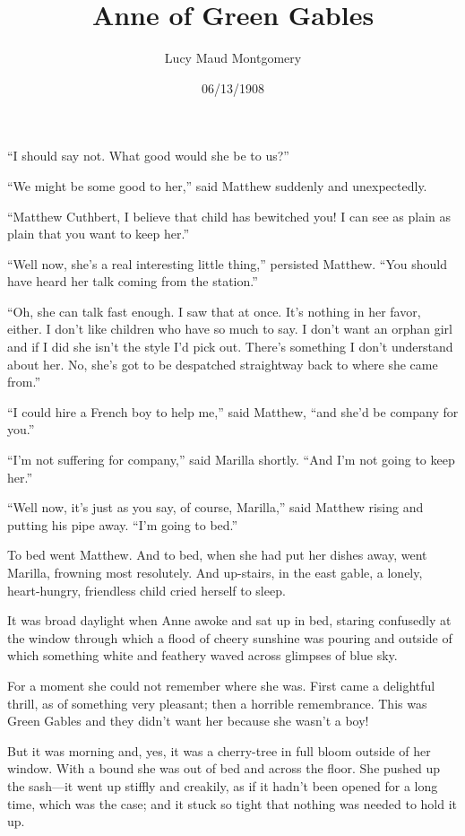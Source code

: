 \documentclass[a4paper]{article}
\title{Anne of Green Gables}
\author{Lucy Maud Montgomery}
\date{06/13/1908}
\begin{document}
\maketitle

{\sffamily ``I should say not. What good would she be to us?''

``We might be some good to her,'' said Matthew suddenly and unexpectedly.

``Matthew Cuthbert, I believe that child has bewitched you! I can see as plain as plain that you want to keep her.''

``Well now, she's a real interesting little thing,'' persisted Matthew. ``You should have heard her talk coming from the station.''

``Oh, she can talk fast enough. I saw that at once. It's nothing in her favor, either. I don't like children who have so much to say. I don't want an orphan girl and if I did she isn't the style I'd pick out. There's something I don't understand about her. No, she's got to be despatched straightway back to where she came from.''}

``I could hire a French boy to help me,'' said Matthew, ``and she'd be company for you.''

``I'm not suffering for company,'' said Marilla shortly. ``And I'm not going to keep her.''

{\rmfamily ``Well now, it's just as you say, of course, Marilla,'' said Matthew rising and putting his pipe away. ``I'm going to bed.''

To bed went Matthew. And to bed, when she had put her dishes away, went Marilla, frowning most resolutely. And up-stairs, in the east gable, a lonely, heart-hungry, friendless child cried herself to sleep.

It was broad daylight when Anne awoke and sat up in bed, staring confusedly at the window through which a flood of cheery sunshine was pouring and outside of which something white and feathery waved across glimpses of blue sky.

For a moment she could not remember where she was. First came a delightful thrill, as of something very pleasant; then a horrible remembrance. This was Green Gables and they didn't want her because she wasn't a boy!}

But it was morning and, yes, it was a cherry-tree in full bloom outside of her window. With a bound she was out of bed and across the floor. She pushed up the sash---it went up stiffly and creakily, as if it hadn't been opened for a long time, which was the case; and it stuck so tight that nothing was needed to hold it up.
\end{document}
